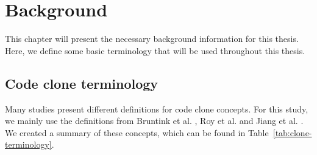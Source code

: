 \chapter{Background}
\label{ch:background}
This chapter will present the necessary background information for this thesis. Here, we define some basic terminology that will be used throughout this thesis.

\section{Code clone terminology}\label{sec:terminology}
Many studies present different definitions for code clone concepts. For this study, we mainly use the definitions from Bruntink et al. \cite{bruntink2005use}, Roy et al. \cite{roy2007survey} and Jiang et al. \cite{jiang2007deckard}. We created a summary of these concepts, which can be found in Table~\ref{tab:clone-terminology}.

